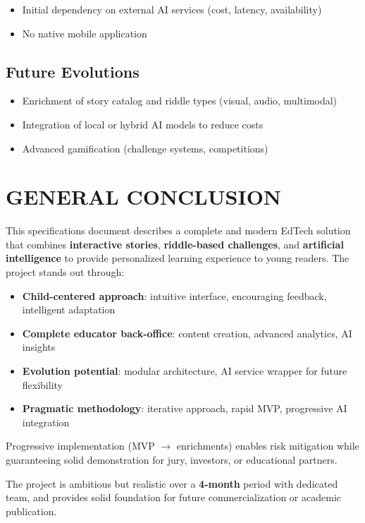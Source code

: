 \documentclass[12pt,a4paper]{article}
\begin{document}
\begin{itemize}
    \item Initial dependency on external AI services (cost, latency, availability)
    \item No native mobile application
\end{itemize}

\subsection{Future Evolutions}

\begin{itemize}
    \item Enrichment of story catalog and riddle types (visual, audio, multimodal)
    \item Integration of local or hybrid AI models to reduce costs
    \item Advanced gamification (challenge systems, competitions)
\end{itemize}

\newpage

\section{GENERAL CONCLUSION}

This specifications document describes a complete and modern EdTech solution that combines \textbf{interactive stories}, \textbf{riddle-based challenges}, and \textbf{artificial intelligence} to provide personalized learning experience to young readers. The project stands out through:

\begin{itemize}
    \item \textbf{Child-centered approach}: intuitive interface, encouraging feedback, intelligent adaptation
    \item \textbf{Complete educator back-office}: content creation, advanced analytics, AI insights
    \item \textbf{Evolution potential}: modular architecture, AI service wrapper for future flexibility
    \item \textbf{Pragmatic methodology}: iterative approach, rapid MVP, progressive AI integration
\end{itemize}

Progressive implementation (MVP $\rightarrow$ enrichments) enables risk mitigation while guaranteeing solid demonstration for jury, investors, or educational partners.

The project is ambitious but realistic over a \textbf{4-month} period with dedicated team, and provides solid foundation for future commercialization or academic publication.
\end{document}

